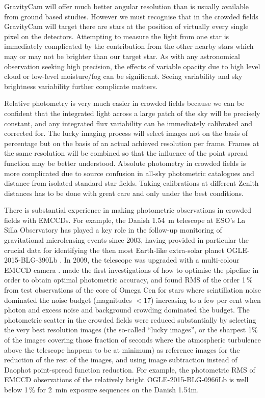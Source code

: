 \documentclass{pasa}%
\begin{document}
GravityCam will offer much better angular resolution than is usually available from ground based studies. However we must recognise that in the crowded fields GravityCam will target there are stars at the position of virtually every single pixel on the detectors. Attempting to measure the light from one star is immediately complicated by the contribution from the other nearby stars which may or may not be brighter than our target star. As with any astronomical observation seeking high precision, the effects of variable opacity due to high level cloud or low-level moisture/fog can be significant. Seeing variability and sky brightness variability further complicate matters.

Relative photometry is very much easier in crowded fields because we can be confident that the integrated light across a large patch of the sky will be precisely constant, and any integrated flux variability can be 
immediately calibrated and corrected for. The lucky imaging process will select images not on the basis of percentage but on the basis of an actual achieved resolution per frame. Frames at the same resolution will be combined so that the influence of the point spread function may be better understood. Absolute photometry in crowded fields is more complicated due to source confusion in all-sky photometric catalogues and distance from isolated standard star fields. Taking calibrations at different Zenith distances has to be done with great care and only under the best conditions. 

There is substantial experience in making photometric observations in crowded fields with EMCCDs. For example, the Danish 1.54~m telescope at ESO's La Silla Observatory has played a key role in the follow-up monitoring of gravitational microlensing events since 2003, having provided in particular the crucial data for identifying the then most Earth-like extra-solar planet OGLE-2015-BLG-390Lb \citep{Bea+2006}. In 2009, the telescope was upgraded with a multi-colour EMCCD camera \citep{Skottfelt+2015}. \citet{Harp+2012} made the first investigations of how to optimise the pipeline in order to obtain optimal photometric accuracy, and found RMS of the order 1\,\% from test observations of the core of Omega Cen for stars where scintillation noise dominated the noise budget (magnitudes $< 17$) increasing to a few per cent when photon and excess noise and background crowding dominated the budget. The photometric scatter in the crowded fields were reduced substantially \citep{Skottfelt+2013,Skottfelt+2015a,Figuera+2016} by selecting the very best resolution images (the so-called ``lucky images'', or the sharpest 1\% of the images covering those fraction of seconds where the atmospheric turbulence above the telescope happens to be at minimum) as reference images for the reduction of the rest of the images, and using image subtraction \citep{Bramich2008} instead of Daophot point-spread function reduction. For example, the photometric RMS of EMCCD observations of the relatively bright OGLE-2015-BLG-0966Lb \citep{Street+2016} is well below 1\,\% for 2~min exposure sequences on the Danish 1.54m. 
\end{document}
